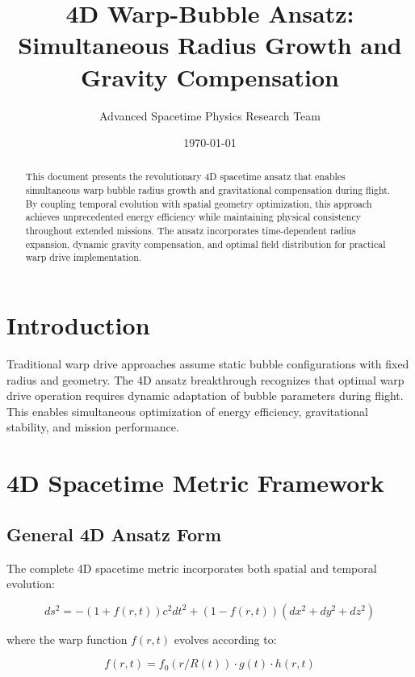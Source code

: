 \documentclass[12pt,a4paper]{article}
\title{4D Warp-Bubble Ansatz:\\Simultaneous Radius Growth and Gravity Compensation}
\author{Advanced Spacetime Physics Research Team}
\date{\today}
\begin{document}
\maketitle

\begin{abstract}
This document presents the revolutionary 4D spacetime ansatz that enables simultaneous warp bubble radius growth and gravitational compensation during flight. By coupling temporal evolution with spatial geometry optimization, this approach achieves unprecedented energy efficiency while maintaining physical consistency throughout extended missions. The ansatz incorporates time-dependent radius expansion, dynamic gravity compensation, and optimal field distribution for practical warp drive implementation.
\end{abstract}

\section{Introduction}

Traditional warp drive approaches assume static bubble configurations with fixed radius and geometry. The 4D ansatz breakthrough recognizes that optimal warp drive operation requires dynamic adaptation of bubble parameters during flight. This enables simultaneous optimization of energy efficiency, gravitational stability, and mission performance.

\section{4D Spacetime Metric Framework}

\subsection{General 4D Ansatz Form}

The complete 4D spacetime metric incorporates both spatial and temporal evolution:

\begin{equation}
ds^2 = -\left(1 + f(r,t)\right)c^2 dt^2 + \left(1 - f(r,t)\right)\left(dx^2 + dy^2 + dz^2\right)
\end{equation}

where the warp function $f(r,t)$ evolves according to:

\begin{equation}
f(r,t) = f_0(r/R(t)) \cdot g(t) \cdot h(r,t)
\end{equation}
\end{document}
